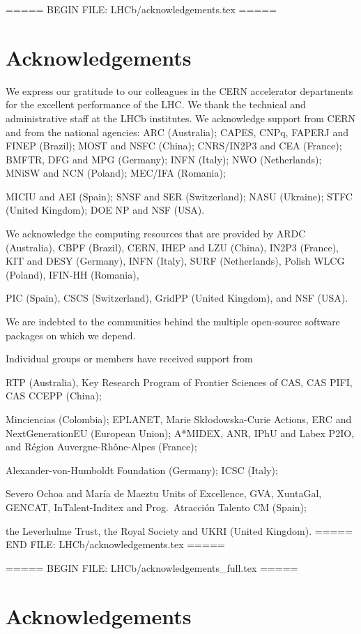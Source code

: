 ===== BEGIN FILE: LHCb/acknowledgements.tex =====
\section*{Acknowledgements}



\noindent We express our gratitude to our colleagues in the CERN
accelerator departments for the excellent performance of the LHC. We
thank the technical and administrative staff at the LHCb
institutes.
We acknowledge support from CERN and from the national agencies:
ARC (Australia);
CAPES, CNPq, FAPERJ and FINEP (Brazil);
MOST and NSFC (China);
CNRS/IN2P3 and CEA (France);
BMFTR, DFG and MPG (Germany);
INFN (Italy);
NWO (Netherlands);
MNiSW and NCN (Poland);
MEC/IFA (Romania);

MICIU and AEI (Spain);
SNSF and SER (Switzerland);
NASU (Ukraine);
STFC (United Kingdom);
DOE NP and NSF (USA).

We acknowledge the computing resources that are provided by ARDC (Australia),
CBPF (Brazil),
CERN,
IHEP and LZU (China),
IN2P3 (France),
KIT and DESY (Germany),
INFN (Italy),
SURF (Netherlands),
Polish WLCG (Poland),
IFIN-HH (Romania),

PIC (Spain), CSCS (Switzerland),
GridPP (United Kingdom),
and NSF (USA).

We are indebted to the communities behind the multiple open-source
software packages on which we depend.

Individual groups or members have received support from

RTP (Australia),
Key Research Program of Frontier Sciences of CAS, CAS PIFI, CAS CCEPP (China);


Minciencias (Colombia);
EPLANET, Marie Sk\l{}odowska-Curie Actions, ERC and NextGenerationEU (European Union);
A*MIDEX, ANR, IPhU and Labex P2IO, and R\'{e}gion Auvergne-Rh\^{o}ne-Alpes (France);

Alexander-von-Humboldt Foundation (Germany);
ICSC (Italy);

Severo Ochoa and Mar\'ia de Maeztu Units of Excellence, GVA, XuntaGal, GENCAT, InTalent-Inditex and Prog.~Atracci\'on Talento CM (Spain);


the Leverhulme Trust, the Royal Society and UKRI (United Kingdom).
===== END FILE: LHCb/acknowledgements.tex =====

===== BEGIN FILE: LHCb/acknowledgements_full.tex =====
\section*{Acknowledgements}



